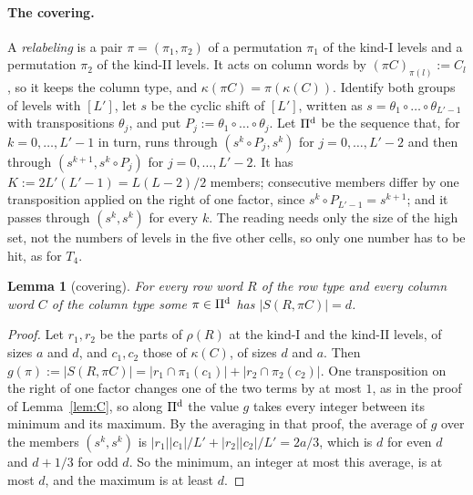 \documentclass[11pt]{article}
\newtheorem{lemma}[theorem]{Lemma}
\theoremstyle{definition}
\theoremstyle{remark}
\begin{document}
\paragraph{The covering.} A \emph{relabeling} is a pair $\pi=(\pi_1,\pi_2)$ of a permutation $\pi_1$ of the kind-I levels and a permutation $\pi_2$ of the kind-II levels. It acts on column words by $(\pi C)_{\pi(l)}:=C_l$, so it keeps the column type, and $\kappa(\pi C)=\pi(\kappa(C))$. Identify both groups of levels with $[L']$, let $s$ be the cyclic shift of $[L']$, written as $s=\theta_1\circ\dots\circ\theta_{L'-1}$ with transpositions $\theta_j$, and put $P_j:=\theta_1\circ\dots\circ\theta_j$. Let $\Pi^{\rm d}$ be the sequence that, for $k=0,\dots,L'-1$ in turn, runs through $(s^k\circ P_j,s^k)$ for $j=0,\dots,L'-2$ and then through $(s^{k+1},s^k\circ P_j)$ for $j=0,\dots,L'-2$. It has $K:=2L'(L'-1)=L(L-2)/2$ members; consecutive members differ by one transposition applied on the right of one factor, since $s^k\circ P_{L'-1}=s^{k+1}$; and it passes through $(s^k,s^k)$ for every $k$. The reading needs only the size of the high set, not the numbers of levels in the five other cells, so only one number has to be hit, as for $T_4$.

\begin{lemma}[covering]\label{lem:C6}
For every row word $R$ of the row type and every column word $C$ of the column type some $\pi\in\Pi^{\rm d}$ has $|S(R,\pi C)|=d$.
\end{lemma}

\begin{proof}
Let $r_1,r_2$ be the parts of $\rho(R)$ at the kind-I and the kind-II levels, of sizes $a$ and $d$, and $c_1,c_2$ those of $\kappa(C)$, of sizes $d$ and $a$. Then $g(\pi):=|S(R,\pi C)|=|r_1\cap\pi_1(c_1)|+|r_2\cap\pi_2(c_2)|$. One transposition on the right of one factor changes one of the two terms by at most $1$, as in the proof of Lemma~\ref{lem:C}, so along $\Pi^{\rm d}$ the value $g$ takes every integer between its minimum and its maximum. By the averaging in that proof, the average of $g$ over the members $(s^k,s^k)$ is $|r_1||c_1|/L'+|r_2||c_2|/L'=2a/3$, which is $d$ for even $d$ and $d+1/3$ for odd $d$. So the minimum, an integer at most this average, is at most $d$, and the maximum is at least $d$.
\end{proof}
\end{document}
